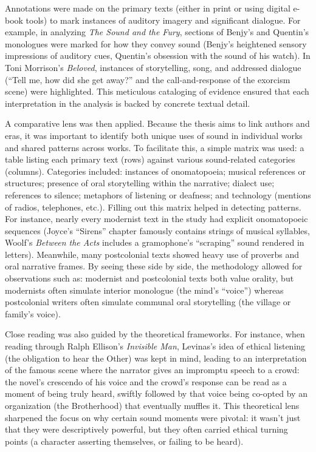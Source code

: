 \documentclass[12pt]{report}
\begin{document}
Annotations were made on the primary texts (either in print or using digital e-book tools) to mark instances of auditory imagery and significant dialogue. For example, in analyzing \textit{The Sound and the Fury}, sections of Benjy’s and Quentin’s monologues were marked for how they convey sound (Benjy’s heightened sensory impressions of auditory cues, Quentin’s obsession with the sound of his watch). In Toni Morrison’s \textit{Beloved}, instances of storytelling, song, and addressed dialogue (“Tell me, how did she get away?” and the call-and-response of the exorcism scene) were highlighted. This meticulous cataloging of evidence ensured that each interpretation in the analysis is backed by concrete textual detail.

A comparative lens was then applied. Because the thesis aims to link authors and eras, it was important to identify both unique uses of sound in individual works and shared patterns across works. To facilitate this, a simple matrix was used: a table listing each primary text (rows) against various sound-related categories (columns). Categories included: instances of onomatopoeia; musical references or structures; presence of oral storytelling within the narrative; dialect use; references to silence; metaphors of listening or deafness; and technology (mentions of radios, telephones, etc.). Filling out this matrix helped in detecting patterns. For instance, nearly every modernist text in the study had explicit onomatopoeic sequences (Joyce’s “Sirens” chapter famously contains strings of musical syllables, Woolf’s \textit{Between the Acts} includes a gramophone’s “scraping” sound rendered in letters). Meanwhile, many postcolonial texts showed heavy use of proverbs and oral narrative frames. By seeing these side by side, the methodology allowed for observations such as: modernist and postcolonial texts both value orality, but modernists often simulate interior monologue (the mind’s “voice”) whereas postcolonial writers often simulate communal oral storytelling (the village or family’s voice).

Close reading was also guided by the theoretical frameworks. For instance, when reading through Ralph Ellison’s \textit{Invisible Man}, Levinas’s idea of ethical listening (the obligation to hear the Other) was kept in mind, leading to an interpretation of the famous scene where the narrator gives an impromptu speech to a crowd: the novel’s crescendo of his voice and the crowd’s response can be read as a moment of being truly heard, swiftly followed by that voice being co-opted by an organization (the Brotherhood) that eventually muffles it. This theoretical lens sharpened the focus on why certain sound moments were pivotal: it wasn’t just that they were descriptively powerful, but they often carried ethical turning points (a character asserting themselves, or failing to be heard).
\end{document}
